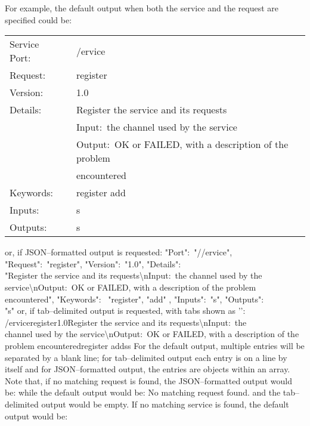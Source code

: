 For example, the default output when both the service and the request are specified could
be:
\outputBegin{}
\begin{tabular}{lp{12.8cm}}
Service Port:\ & /\textdollar{}ervice\\
Request:\ & register\\
Version:\ & 1.0\\
Details:\ & Register the service and its requests\\
 & Input:\ the channel used by the service\\
 & Output:\ OK or FAILED, with a description of the problem\\
 & encountered\\
Keywords:\ & register add\\
Inputs:\ & s\\
Outputs:\ & s\\
\end{tabular}
\outputEnd{}
or, if JSON--formatted output is requested:
\outputBegin{}
\openSq{} \textbraceleft{} "Port":\ "//\textdollar{}ervice", "Request":\ "register",
"Version":\ "1.0", "Details":\ \\
"Register the service and its requests\textbackslash{}nInput:\ the channel used by the\\
service\textbackslash{}nOutput:\ OK or FAILED, with a description of the problem\\
encountered", "Keywords":\ \openSq{} "register", "add" \closeSq, "Inputs":\ "s",
"Outputs":\ \\
"s" \textbraceright{} \closeSq
\outputEnd{}
or, if tab--delimited output is requested, with tabs shown as
'\texttt{\boldmath{$\vdash$}}':
\outputBegin{}
/\textdollar{}ervice\pseudotab{}register\pseudotab{}1.0\pseudotab{}Register the service
and its requests\textbackslash{}nInput:\ the\\
channel used by the service\textbackslash{}nOutput:\ OK or FAILED, with a description of
the\\
problem encountered\pseudotab{}register add\pseudotab{}s\pseudotab{}s
\outputEnd{}
For the default output, multiple entries will be separated by a blank line; for
tab--delimited output each entry is on a line by itself and for JSON--formatted output,
the entries are objects within an array.
Note that, if no matching request is found, the JSON--formatted output would be:
\outputBegin{}
\sqPair
\outputEnd{}
while the default output would be:
\outputBegin{}
No matching request found.
\outputEnd{}
and the tab--delimited output would be empty.
If no matching service is found, the default output would be:
